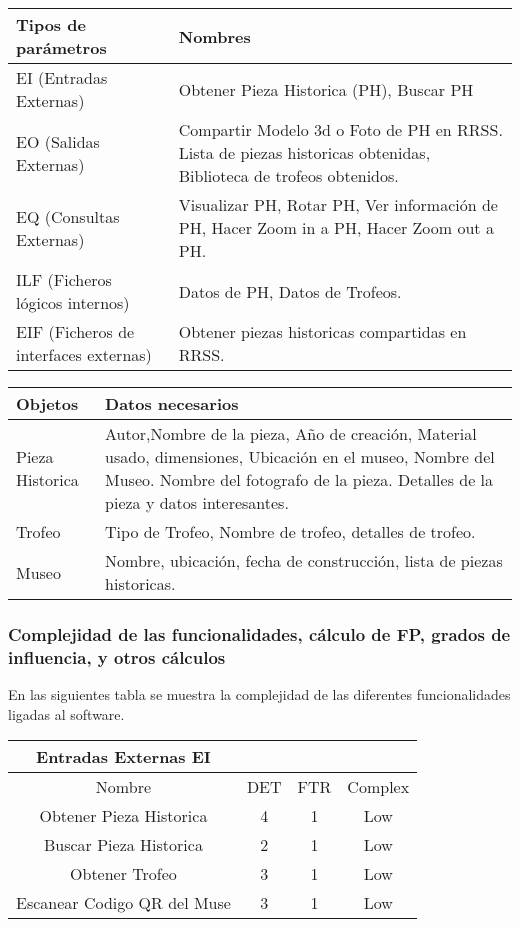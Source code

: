 \begin{longtable}{|p{5cm}|p{8cm}|}
\hline 
Tipos de parámetros & Nombres \\ 
\hline 
EI (Entradas Externas) & Obtener Pieza Historica (PH), Buscar PH \\ 
\hline 
EO (Salidas Externas) & Compartir Modelo 3d o Foto de PH en RRSS.
Lista de piezas historicas obtenidas, Biblioteca de trofeos obtenidos.
 \\ 
\hline 
EQ (Consultas Externas) & Visualizar PH, Rotar PH, Ver información de PH, Hacer Zoom in a PH, Hacer Zoom out a
PH.
 \\ 
\hline 
ILF (Ficheros lógicos internos) & Datos de PH, Datos de Trofeos. \\ 
\hline 
EIF (Ficheros de interfaces externas) & Obtener piezas historicas compartidas en
RRSS.
 \\ 
\hline 
\end{longtable} 

\begin{longtable}{|p{5cm}|p{8cm}|}
\hline 
Objetos & Datos necesarios \\ 
\hline 
Pieza Historica & Autor,Nombre de la pieza, Año de creación, Material
usado, dimensiones, Ubicación en el museo, Nombre del
Museo. Nombre del fotografo de la pieza. Detalles de la
pieza y datos interesantes. \\ 
\hline 
Trofeo & Tipo de Trofeo, Nombre de trofeo, detalles de trofeo. \\ 
\hline 
Museo & Nombre, ubicación, fecha de construcción, lista de piezas
historicas. \\ 
\hline 
\end{longtable} 

\subsubsection{Complejidad de las funcionalidades, cálculo de FP, grados de influencia, y otros cálculos}
En las siguientes tabla se muestra la complejidad de las diferentes funcionalidades ligadas al software.

\begin{longtable}{|c|c|c|c|}
\hline 
Entradas Externas EI &   &   &   \\ 
\hline 
Nombre & DET & FTR & Complex \\ 
\hline 
Obtener Pieza Historica & 4 & 1 & Low \\ 
\hline 
Buscar Pieza Historica & 2 & 1 & Low \\ 
\hline 
Obtener Trofeo & 3 & 1 & Low \\ 
\hline 
Escanear Codigo QR del Muse & 3 & 1 & Low \\ 
\hline 
\end{longtable}

